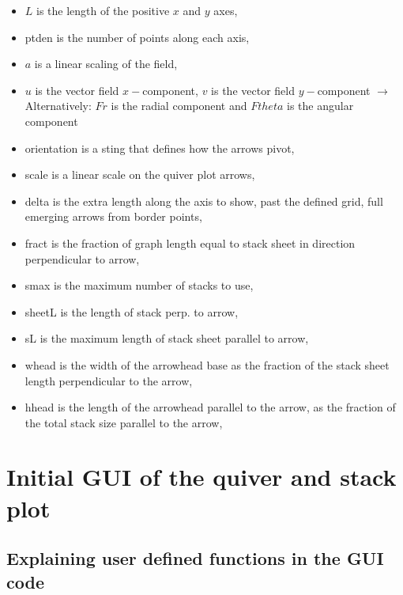 \documentclass[12pt]{report}
\begin{document}
\begin{itemize}
	\item $L$ is the length of the positive $x$ and $y$ axes,
	\item pt\textunderscore den is the number of points along each axis,
	\item $a$ is a linear scaling of the field,	
	\item $u$ is the vector field $x-$component, $v$ is the vector field $y-$component $\longrightarrow$  Alternatively: $Fr$ is the radial component and $Ftheta$ is the angular component
	\item orientation is a sting that defines how the arrows pivot,
	\item scale is a linear scale on the quiver plot arrows,
	\item delta is the extra length along the axis to show, past the defined grid, full emerging arrows from border points,
	\item fract is the fraction of graph length equal to stack sheet in direction perpendicular to arrow,
	\item s\textunderscore max is the maximum number of stacks to use,
	\item sheet\textunderscore L is the length of stack perp. to arrow,
	\item s\textunderscore L is the maximum length of stack sheet parallel to arrow,
	\item w\textunderscore head is the width of the arrowhead base as the fraction of the stack sheet length perpendicular to the arrow,
	\item h\textunderscore head is the length of the arrowhead parallel to the arrow, as the fraction of the total stack size parallel to the arrow,

\end{itemize}


\section{Initial GUI of the quiver and stack plot}

\subsection{Explaining user defined functions in the GUI code}
\end{document}

